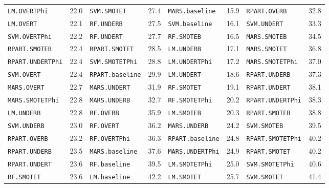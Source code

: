 \begin{table}[t]
{{\begin{tabular}{lclclclc}
\texttt{LM.OVERTPhi} & 22.0 & \texttt{SVM.SMOTET} & 27.4 & \texttt{MARS.baseline} & 15.9 & \texttt{RPART.OVERB} & 32.8 \\
\texttt{LM.OVERT} & 22.1 & \texttt{RF.UNDERB} & 27.5 & \texttt{SVM.baseline} & 16.1 & \texttt{SVM.UNDERT} & 33.3 \\
\texttt{SVM.OVERTPhi} & 22.2 & \texttt{RF.UNDERT} & 27.7 & \texttt{RF.SMOTEB} & 16.5 & \texttt{MARS.SMOTEB} & 34.5 \\
\texttt{RPART.SMOTEB} & 22.4 & \texttt{RPART.SMOTET} & 28.5 & \texttt{LM.UNDERB} & 17.1 & \texttt{MARS.SMOTET} & 36.8 \\
\texttt{RPART.UNDERTPhi} & 22.4 & \texttt{SVM.SMOTETPhi} & 28.8 & \texttt{LM.UNDERTPhi} & 17.2 & \texttt{MARS.SMOTETPhi} & 37.0 \\
\texttt{SVM.OVERT} & 22.4 & \texttt{RPART.baseline} & 29.9 & \texttt{LM.UNDERT} & 18.6 & \texttt{RPART.UNDERB} & 37.3 \\
\texttt{MARS.OVERT} & 22.7 & \texttt{MARS.UNDERT} & 31.9 & \texttt{RF.SMOTET} & 19.1 & \texttt{RPART.UNDERT} & 38.1 \\
\texttt{MARS.SMOTETPhi} & 22.8 & \texttt{MARS.UNDERB} & 32.7 & \texttt{RF.SMOTETPhi} & 20.2 & \texttt{RPART.UNDERTPhi} & 38.3 \\
\texttt{LM.UNDERB} & 22.8 & \texttt{RF.OVERB} & 35.9 & \texttt{LM.SMOTEB} & 20.3 & \texttt{RPART.SMOTEB} & 38.8 \\
\texttt{SVM.UNDERB} & 23.0 & \texttt{RF.OVERT} & 36.2 & \texttt{MARS.UNDERB} & 24.2 & \texttt{SVM.SMOTEB} & 39.5 \\
\texttt{RPART.OVERB} & 23.2 & \texttt{RF.OVERTPhi} & 36.3 & \texttt{RPART.baseline} & 24.8 & \texttt{RPART.SMOTETPhi} & 40.2 \\
\texttt{RPART.UNDERB} & 23.5 & \texttt{MARS.baseline} & 37.6 & \texttt{MARS.UNDERTPhi} & 24.9 & \texttt{RPART.SMOTET} & 40.2 \\
\texttt{RPART.UNDERT} & 23.6 & \texttt{RF.baseline} & 39.5 & \texttt{LM.SMOTETPhi} & 25.0 & \texttt{SVM.SMOTETPhi} & 40.6 \\
\texttt{RF.SMOTET} & 23.6 & \texttt{LM.baseline} & 42.2 & \texttt{LM.SMOTET} & 25.7 & \texttt{SVM.SMOTET} & 41.4 \\
\bottomrule
\end{tabular}%
}%
}
\end{table}
